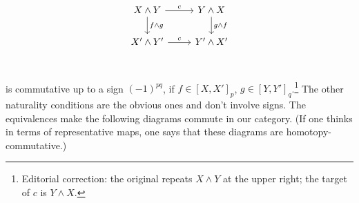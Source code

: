 \documentclass[../main]{subfiles}
\begin{document}
\[
\begin{tikzcd}
    X \wedge Y & Y \wedge X \\
    X' \wedge Y' & Y' \wedge X' \\
    \arrow[from=1-1, to=1-2, "c"]
    \arrow[from=1-1, to=2-1, "f \wedge g"]
    \arrow[from=1-2, to=2-2, "g \wedge f"]
    \arrow[from=2-1, to=2-2, "c"] 
\end{tikzcd}
\]
is commutative up to a sign $(-1)^{pq}$, if $f \in [X, X']_p$, $g \in [Y, Y']_q$.\footnote{Editorial correction: the original repeats $X\wedge Y$ at the upper right; the target of $c$ is $Y\wedge X$.}
The other naturality conditions are the obvious ones and don't involve signs.
The equivalences make the following diagrams commute in our category.
(If one thinks in terms of representative maps, one says that these diagrams are homotopy-commutative.)
\end{document}
